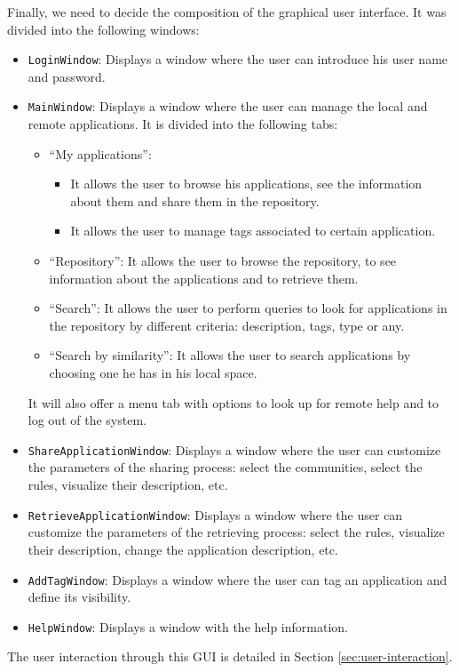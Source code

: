 Finally, we need to decide the composition of the graphical user interface. It
was divided into the following windows:
\begin{itemize}
  	\item \verb|LoginWindow|: Displays a window where the user can introduce his
  	user name and password.
  	\item \verb|MainWindow|: Displays a window where the user can manage the
  	local and remote applications. It is divided into the following tabs:
	\begin{itemize}
  		\item ``My applications'': 
  			\begin{itemize}
		  		\item It allows the user to browse his applications, see the 
		  		information about them and share them in the repository.
		  		\item It allows the user to manage tags associated to certain 
		  		application.
              \end{itemize}
  		\item ``Repository'': It allows the user to browse the repository, to see
  		information about the applications and to retrieve them.
  		\item ``Search'': It allows the user to perform queries 
  		to look for applications in the repository by different criteria:
  		description, tags, type or any.
  		\item ``Search by similarity'': It allows the user to search
  		applications by choosing one he has in his local space.
    \end{itemize}
    It will also offer a menu tab with options to look up for remote help and
    to log out of the system.
    
    \item \verb|ShareApplicationWindow|: Displays a window where the user can
    customize the parameters of the sharing process: select the communities, 
    select the rules, visualize their description, etc.
    \item \verb|RetrieveApplicationWindow|: Displays a window where the user can
    customize the parameters of the retrieving process: select the rules,
    visualize their description, change the application description, etc.
    \item \verb|AddTagWindow|: Displays a window where the user can tag an
    application and define its visibility.
    \item \verb|HelpWindow|: Displays a window with the help information.
    

\end{itemize}

The user interaction through this GUI is detailed in Section
\ref{sec:user-interaction}.

